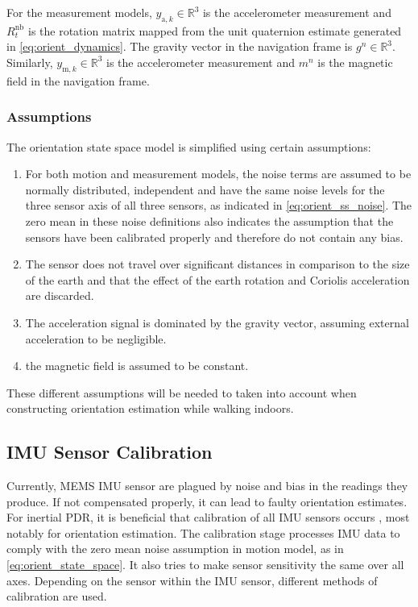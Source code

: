 For the measurement models, $y_{\mathrm{a}, k}\in \mathbb{R}^3$ is the accelerometer measurement and $R^\mathrm{nb}_t$ is the rotation matrix mapped from the unit quaternion estimate generated in \eqref{eq:orient_dynamics}. The gravity vector in the navigation frame is $g^n \in \mathbb{R}^3$. Similarly, $y_{\mathrm{m}, k}\in \mathbb{R}^3$ is the accelerometer measurement and $m^n$ is the magnetic field in the navigation frame. \par 

\subsubsection{Assumptions}
The orientation state space model is simplified using certain assumptions:
\begin{enumerate}
	\item For both motion and measurement models, the noise terms are assumed to be normally distributed, independent and have the same noise levels for the three sensor axis of all three sensors, as indicated in \eqref{eq:orient_ss_noise}. The zero mean in these noise definitions also indicates the assumption that the sensors have been calibrated properly and therefore do not contain any bias. \par
	
	\item The sensor does not travel over significant distances in comparison to the size of the earth \cite{Kok2017} and that the effect of the earth rotation and Coriolis acceleration are discarded.
	 
	\item The acceleration signal is dominated by the gravity vector, assuming external acceleration to be negligible. 
	
	\item the magnetic field is assumed to be constant. 
\end{enumerate}

These different assumptions will be needed to taken into account when constructing orientation estimation while walking indoors.

\subsection{\ac{IMU} Sensor Calibration}
\label{sec:sensor_calibration}
Currently, \ac{MEMS} \ac{IMU} sensor are plagued by noise and bias in the readings they produce. If not compensated properly, it can lead to faulty orientation estimates. For inertial \ac{PDR}, it is beneficial that  calibration of all IMU sensors occurs \cite{Moder2017}, most notably for orientation estimation. The calibration stage processes IMU data to comply with the zero mean noise assumption in motion model, as in \eqref{eq:orient_state_space}. It also tries to make sensor sensitivity the same over all axes. Depending on the sensor within the \ac{IMU} sensor, different methods of calibration are used. \par 

